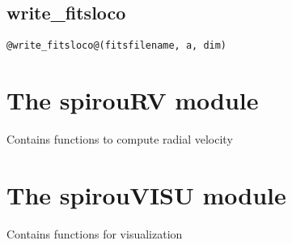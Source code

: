 \vspace{0.5cm}
\subsection{write\_fitsloco}
\begin{lstlisting}[style=pythonstyle]
@write_fitsloco@(fitsfilename, a, dim)
\end{lstlisting}


\clearpage
\newpage
\section{The spirouRV module}

Contains functions to compute radial velocity

\clearpage
\newpage
\section{The spirouVISU module}

Contains functions for visualization
